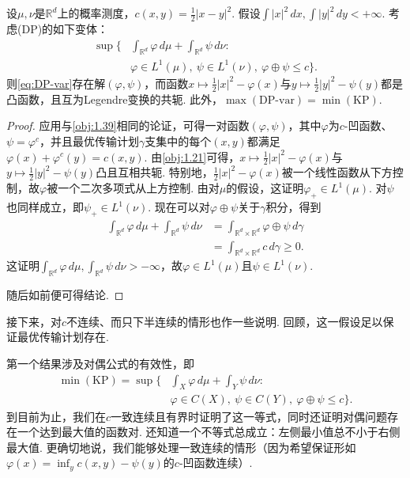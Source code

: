 \begin{theorem}\label{obj:1.40}
设$\mu,\nu$是$\mathbb R^d$上的概率测度，$c(x,y)=\frac12|x-y|^2$. 假设$\int|x|^2\,dx,\int|y|^2\,dy<+\infty$. 考虑(DP)的如下变体：
\begin{equation*}\tag{DP-var}\label{eq:DP-var}
\begin{aligned}
\sup\biggl\{&\int_{\mathbb R^d}\varphi\,d\mu+\int_{\mathbb R^d}\psi\,d\nu:\\
&\varphi\in L^1(\mu),\ \psi\in L^1(\nu),\ \varphi\oplus\psi\le c\biggr\}.
\end{aligned}
\end{equation*}
则\eqref{eq:DP-var}存在解$(\varphi,\psi)$，而函数$x\mapsto\frac12|x|^2-\varphi(x)$与$y\mapsto\frac12|y|^2-\psi(y)$都是凸函数，且互为Legendre变换的共轭. 此外，$\max(\mathrm{DP\text{-}var})=\min(\mathrm{KP})$.
\end{theorem}
\begin{proof}
应用与\autoref{obj:1.39}相同的论证，可得一对函数$(\varphi,\psi)$，其中$\varphi$为$c$-凹函数、$\psi=\varphi^c$，并且最优传输计划$\gamma$支集中的每个$(x,y)$都满足$\varphi(x)+\varphi^c(y)=c(x,y)$. 由\autoref{obj:1.21}可得，$x\mapsto\frac12|x|^2-\varphi(x)$与$y\mapsto\frac12|y|^2-\psi(y)$凸且互相共轭. 特别地，$\frac12|x|^2-\varphi(x)$被一个线性函数从下方控制，故$\varphi$被一个二次多项式从上方控制. 由对$\mu$的假设，这证明$\varphi_+\in L^1(\mu)$. 对$\psi$也同样成立，即$\psi_+\in L^1(\nu)$. 现在可以对$\varphi\oplus\psi$关于$\gamma$积分，得到
\begin{equation*}
\begin{aligned}
\int_{\mathbb R^d}\varphi\,d\mu+\int_{\mathbb R^d}\psi\,d\nu
&=\int_{\mathbb R^d\times\mathbb R^d}\varphi\oplus\psi\,d\gamma\\
&=\int_{\mathbb R^d\times\mathbb R^d}c\,d\gamma\ge0.
\end{aligned}
\end{equation*}
这证明$\int_{\mathbb R^d}\varphi\,d\mu,\int_{\mathbb R^d}\psi\,d\nu>-\infty$，故$\varphi\in L^1(\mu)$且$\psi\in L^1(\nu)$.

随后如前便可得结论.
\end{proof}

接下来，对$c$不连续、而只下半连续的情形也作一些说明. 回顾，这一假设足以保证最优传输计划存在.

第一个结果涉及对偶公式的有效性，即
\begin{equation}\label{eq:1.6}
\begin{aligned}
\min(\mathrm{KP})=\sup\biggl\{&\int_X\varphi\,d\mu+\int_Y\psi\,d\nu:\\
&\varphi\in C(X),\ \psi\in C(Y),\ \varphi\oplus\psi\le c\biggr\}.
\end{aligned}
\end{equation}
到目前为止，我们在$c$一致连续且有界时证明了这一等式，同时还证明对偶问题存在一个达到最大值的函数对. 还知道一个不等式总成立：左侧最小值总不小于右侧最大值. 更确切地说，我们能够处理一致连续的情形（因为希望保证形如$\varphi(x)=\inf_y c(x,y)-\psi(y)$的$c$-凹函数连续）.

